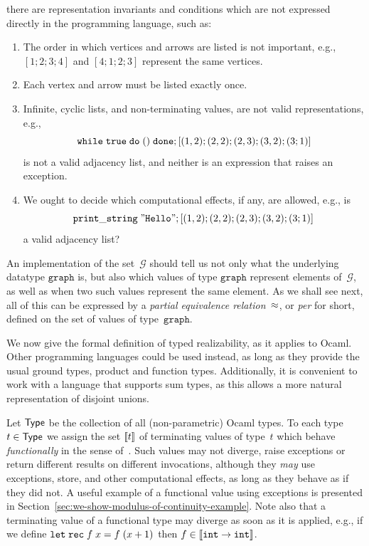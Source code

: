there are representation invariants and conditions which are not
expressed directly in the programming language, such as:
%
\begin{enumerate}
\item The order in which vertices and arrows are listed is not
  important, e.g., $[1;2;3;4]$ and $[4;1;2;3]$ represent the same vertices.
\item Each vertex and arrow must be listed exactly once.
\item Infinite, cyclic lists, and non-terminating values, are not
  valid representations, e.g.,
  \begin{equation*}
    \mathtt{while}\;\mathtt{true}\;\mathtt{do}\;()\;\mathtt{done}; [(1,2);(2,2);(2,3);(3,2);(3;1)]
  \end{equation*}
  is not a valid adjacency list, and neither is an expression that
  raises an exception.
\item We ought to decide which computational effects, if any, are
  allowed, e.g., is
  \begin{equation*}
    \mathtt{print\_string}\;\mathtt{"Hello"}; [(1,2);(2,2);(2,3);(3,2);(3;1)]
  \end{equation*}
  a valid adjacency list?
\end{enumerate}
%
An implementation of the set~$\mathcal{G}$ should tell us not only
what the underlying datatype $\mathtt{graph}$ is, but also which
values of type $\mathtt{graph}$ represent elements of~$\mathcal{G}$,
as well as when two such values represent the same element. As we
shall see next, all of this can be expressed by a \emph{partial
  equivalence relation}~$\approx$, or \emph{per} for short, defined on
the set of values of type~$\mathtt{graph}$.

We now give the formal definition of typed realizability, as it
applies to Ocaml. Other programming languages could be used instead,
as long as they provide the usual ground types, product and function
types. Additionally, it is convenient to work with a language that
supports sum types, as this allows a more natural representation of
disjoint unions.

Let $\mathsf{Type}$ be the collection of all (non-parametric) Ocaml types. To
each type $t \in \mathsf{Type}$ we assign the set $[\![t]\!]$ of
terminating values of type~$t$ which behave \emph{functionally} in the
sense of~\cite{longley99when}. Such values may not diverge, raise
exceptions or return different results on different invocations,
although they \emph{may} use exceptions, store, and other
computational effects, as long as they behave as if they did not. A
useful example of a functional value using exceptions is presented in
Section~\ref{sec:we-show-modulus-of-continuity-example}. Note also
that a terminating value of a functional type may diverge as soon as
it is applied, e.g., if we define $\mathtt{let}\;\mathtt{rec}\;f\;x = f\;(x+1)$ then $f
\in [\![\mathtt{int} \to \mathtt{int}]\!]$.

